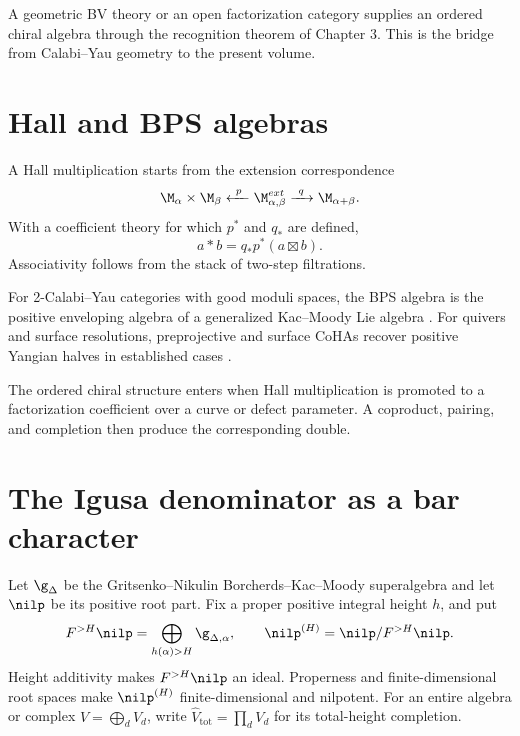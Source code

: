 A geometric BV theory or an open factorization category supplies an ordered chiral algebra through the recognition theorem of Chapter 3. This is the bridge from Calabi--Yau geometry to the present volume.

\chapter{Hall and BPS algebras}
A Hall multiplication starts from the extension correspondence
\[
 \M_{\alpha}\times\M_{\beta}
 \xleftarrow{\ p\ }\M_{\alpha,\beta}^{\mathrm{ext}}
 \xrightarrow{\ q\ }\M_{\alpha+\beta}.
\]
With a coefficient theory for which $p^*$ and $q_*$ are defined,
\[
 a*b=q_*p^*(a\boxtimes b).
\]
Associativity follows from the stack of two-step filtrations.

For 2-Calabi--Yau categories with good moduli spaces, the BPS algebra is the positive enveloping algebra of a generalized Kac--Moody Lie algebra \cite{DHS}. For quivers and surface resolutions, preprojective and surface CoHAs recover positive Yangian halves in established cases \cite{SVYangians,DPPSSV}.

The ordered chiral structure enters when Hall multiplication is promoted to a factorization coefficient over a curve or defect parameter. A coproduct, pairing, and completion then produce the corresponding double.

\chapter{The Igusa denominator as a bar character}
Let $\g_\Delta$ be the Gritsenko--Nikulin Borcherds--Kac--Moody superalgebra and let $\nilp$ be its positive root part.
Fix a proper positive integral height $h$, and put
\[
 F^{>H}\nilp=\bigoplus_{h(\alpha)>H}\g_{\Delta,\alpha},
 \qquad \nilp^{(H)}=\nilp/F^{>H}\nilp.
\]
Height additivity makes $F^{>H}\nilp$ an ideal.
Properness and finite-dimensional root spaces make $\nilp^{(H)}$ finite-dimensional and nilpotent.
For an entire algebra or complex $V=\bigoplus_dV_d$, write
$\widehat V_{\mathrm{tot}}=\prod_dV_d$ for its total-height completion.

